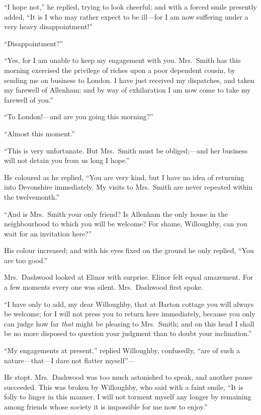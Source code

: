 ``I hope not,'' he replied, trying to look cheerful;
and with a forced smile presently added, ``It is I who may
rather expect to be ill---for I am now suffering under a
very heavy disappointment!''

``Disappointment?''

``Yes, for I am unable to keep my engagement with you.
Mrs.\ Smith has this morning exercised the privilege
of riches upon a poor dependent cousin, by sending me on
business to London.  I have just received my dispatches,
and taken my farewell of Allenham; and by way of exhilaration
I am now come to take my farewell of you.''

``To London!---and are you going this morning?''

``Almost this moment.''

``This is very unfortunate.  But Mrs.\ Smith must
be obliged;---and her business will not detain you from
us long I hope.''

He coloured as he replied, ``You are very kind, but I
have no idea of returning into Devonshire immediately.
My visits to Mrs.\ Smith are never repeated within
the twelvemonth.''

``And is Mrs.\ Smith your only friend?  Is Allenham the only
house in the neighbourhood to which you will be welcome?
For shame, Willoughby, can you wait for an invitation here?''

His colour increased; and with his eyes fixed
on the ground he only replied, ``You are too good.''

Mrs.\ Dashwood looked at Elinor with surprise.
Elinor felt equal amazement.  For a few moments every one
was silent.  Mrs.\ Dashwood first spoke.

``I have only to add, my dear Willoughby, that at
Barton cottage you will always be welcome; for I will not
press you to return here immediately, because you only
can judge how far \emph{that} might be pleasing to Mrs.\ Smith;
and on this head I shall be no more disposed to question
your judgment than to doubt your inclination.''

``My engagements at present,'' replied Willoughby,
confusedly, ``are of such a nature---that---I dare not flatter
myself''---%

He stopt.  Mrs.\ Dashwood was too much astonished
to speak, and another pause succeeded.  This was broken
by Willoughby, who said with a faint smile, ``It is folly
to linger in this manner.  I will not torment myself
any longer by remaining among friends whose society
it is impossible for me now to enjoy.''


